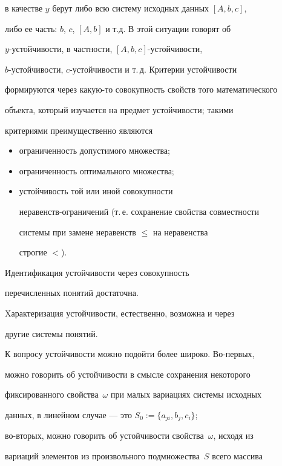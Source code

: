 в качестве $y$ берут либо всю систему исходных данных $[A,b,c]$,


либо ее часть: $b$, $c$, $[A,b]$ и т.д. В этой ситуации говорят об


$y$-устойчивости, в частности, $[A,b,c]$-устойчивости,


$b$-устойчивости, $c$-устойчивости и т.\,д. Критерии устойчивости


формируются через какую-то совокупность свойств того математического


объекта, который изучается на предмет устойчивости; такими


критериями преимущественно являются


\begin{itemize}


\item[1)] ограниченность допустимого множества;


\item[2)] ограниченность оптимального множества;


\item[3)] устойчивость той или иной совокупности


неравенств-ограничений (т.\,е. сохранение свойства совместности


системы при замене неравенств $\leq$ на неравенства


строгие $<$).


\end{itemize}





Идентификация устойчивости через совокупность


перечисленных понятий достаточна.


Xарактеризация устойчивости, естественно, возможна и через


другие системы понятий.





К вопросу устойчивости можно подойти более широко. Во-первых,


можно говорить об устойчивости в смысле сохранения некоторого


фиксированного свойства~$\omega$ при малых вариациях системы исходных


данных, в линейном случае --- это $S_0:= \{a_{ji},b_j,c_i\}$;


во-вторых, можно говорить об устойчивости свойства~$\omega$, исходя из


вариаций элементов из произвольного подмножества~$S$ всего массива


